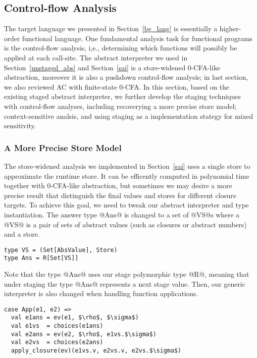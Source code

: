 \subsection{Control-flow Analysis} \label{cfa}

The target language we presented in Section~\ref{bg_lang} is essentially a higher-order functional language.
One fundamental analysis task for functional programs is the control-flow analysis, i,e., determining
which functions will possibly be applied at each call-site. 
The abstract interpreter we used in Section~\ref{unstaged_abs} and Section~\ref{sai} is a store-widened 
0-CFA-like abstraction, moreover it is also a pushdown control-flow analysis; 
in last section, we also reviewed AC with finite-state 0-CFA.
In this section, based on the existing staged abstract interpreter, we further
develop the staging techniques with control-flow analyses, including recoverying a more precise store model;
context-sensitive analsis, and using staging as a implementation stategy for mixed sensitivity.

\subsubsection{A More Precise Store Model}

The store-widened analysis we implemented in Section~\ref{sai} uses a single store to approximate
the runtime store. It can be efficently computed in polynomial time together with 0-CFA-like abstraction, 
but sometimes we may desire a 
more precise result that distinguish the final values and stores for different closure targets. 
To achieve this goal,
we need to tweak our abstract interpreter and type instantiation. The answer type @Ans@ is changed to
a set of @VS@s where a @VS@ is a pair of sets of abstract values (such as closures or abstract numbers)
and a store. 

\begin{lstlisting}
type VS = (Set[AbsValue], Store)
type Ans = R[Set[VS]]
\end{lstlisting}

Note that the type @Ans@ uses our stage polymorphic type @R@, meaning that under staging the type @Ans@
represents a next stage value. Then, our generic interpreter is also changed when handling function 
applications.

\begin{lstlisting}
case App(e1, e2) =>
  val e1ans = ev(e1, $\rho$, $\sigma$)
  val e1vs  = choices(e1ans)
  val e2ans = ev(e2, $\rho$, e1vs.$\sigma$)
  val e2vs  = choices(e2ans)
  apply_closure(ev)(e1vs.v, e2vs.v, e2vs.$\sigma$)
\end{lstlisting}

